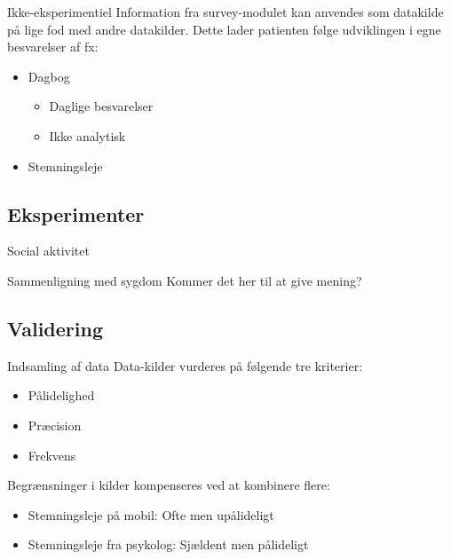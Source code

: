 \begin{frame}{Ikke-eksperimentiel}
Information fra survey-modulet kan anvendes som datakilde på lige fod med andre datakilder.
Dette lader patienten følge udviklingen i egne besvarelser af fx:
\begin{itemize}
\pause
\item Dagbog
\begin{itemize}
\item Daglige besvarelser
\item Ikke analytisk
\end{itemize}
\pause
\item Stemningsleje\\

\mygraph{\gstem{}}
\end{itemize}
\end{frame}

\subsection{Eksperimenter}

\begin{frame}{Social aktivitet}
\end{frame}

\begin{frame}{Sammenligning med sygdom}
Kommer det her til at give mening?\\
\end{frame}

\subsection{Validering}
\begin{frame}{Indsamling af data}
Data-kilder vurderes på følgende tre kriterier:
\begin{itemize}
\item Pålidelighed
\item Præcision
\item Frekvens
\end{itemize}\pause
Begrænsninger i kilder kompenseres ved at kombinere flere:
\begin{itemize}
\item Stemningsleje på mobil: Ofte men upålideligt
\item Stemningsleje fra psykolog: Sjældent men pålideligt
\end{itemize}
\end{frame}

